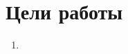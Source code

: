 \documentclass[../main/main.tex]{subfiles}
\begin{document}
    \newpage
    \section{Цели работы}
    \label{sec:aims}
    \begin{enumerate}
        \item
    \end{enumerate}
\end{document}
